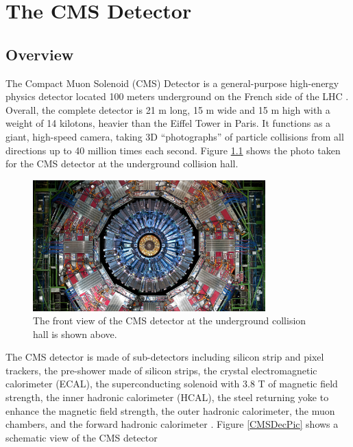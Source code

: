 \chapter{The CMS Detector}

\section{Overview}

The Compact Muon Solenoid (CMS) Detector is a general-purpose high-energy physics detector located 100 meters underground on the French side of the LHC \cite{CMSDetector}. Overall, the complete detector is 21 m long, 15 m wide and 15 m high with a weight of 14 kilotons, heavier than the Eiffel Tower in Paris. It functions as a giant, high-speed camera, taking 3D ``photographs'' of particle collisions from all directions up to 40 million times each second. Figure \ref{CMSRealPic} shows the photo taken for the CMS detector at the underground collision hall.

\begin{figure}[hbtp]
\begin{center}
\includegraphics[width=0.80\textwidth]{Figures/Chapter3/CMSRealPic.jpg}
\caption{The front view of the CMS detector at the underground collision hall is shown above.}
\label{CMSRealPic}
\end{center}
\end{figure} 

The CMS detector is made of sub-detectors including silicon strip and pixel trackers, the pre-shower made of silicon strips, the crystal electromagnetic calorimeter (ECAL), the superconducting solenoid with 3.8 T of magnetic field strength, the inner hadronic calorimeter (HCAL), the steel returning yoke to enhance the magnetic field strength, the outer hadronic calorimeter, the muon chambers, and the forward hadronic calorimeter \cite{CMSDetector}. Figure \ref{CMSDecPic} shows a schematic view of the CMS detector

